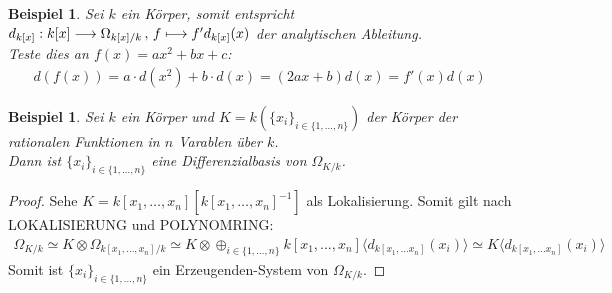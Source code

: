 \documentclass[10pt,a4paper]{report}
\newcounter{Aussage}[chapter]
\newtheorem{bsp}[Aussage]{Beispiel}
\newcommand{\function}[5]{\nolinebreak{#1:#2 \longrightarrow #3 \, , \, #4 \longmapsto #5}}
\newcommand{\divR}[2]{\Omega_{#1/#2}}
\newcommand{\divf}[1]{d_{#1}}
\newcommand{\tensor}[3]{#1 \otimes #3}
\newcommand{\lok}[2]{#1 [#2^{-1}]}
\begin{document}
\begin{bsp}\label{Ableitung ist Ableitung}
Sei $k$ ein Körper, somit entspricht $\function{\divf{k[x]}}{k[x]}{\divR{k[x]}{k}}{f}{f'\divf{k[x]}(x)}$ der analytischen Ableitung.\\
Teste dies an $f(x)=ax^2 + bx +c$:
\begin{gather*}
d(f(x)) = a \cdot d(x^2) + b \cdot d(x) = (2ax + b) d(x) = f'(x) d(x) 
\end{gather*}
\end{bsp}


\begin{bsp}
Sei $k$ ein Körper und $K = k(\lbrace x_i \rbrace_{i \in \lbrace 1,\dots,n \rbrace})$ der Körper der rationalen Funktionen in $n$ Varablen über $k$.\\
Dann ist $\lbrace x_i \rbrace_{i \in \lbrace 1,\dots,n \rbrace}$ eine Differenzialbasis von $\divR{K}{k}$.
\end{bsp}
\begin{proof}
Sehe $K = \lok{k[x_1,\dots,x_n]}{k[x_1,\dots,x_n]}$ als Lokalisierung. Somit gilt nach LOKALISIERUNG und POLYNOMRING:
\begin{gather*}
\divR{K}{k} \simeq \tensor{K}{k[x_1,\dots,x_n]}{\divR{k[x_1,\dots,x_n]}{k}} \simeq \tensor{K}{k[x_1,\dots,x_n]}{\oplus_{i \in \lbrace 1,\dots,n \rbrace} k[x_1,\dots,x_n]\langle \divf{k[x_1,\dots x_n]}(x_i) \rangle} \simeq K\langle \divf{k[x_1,\dots x_n]}(x_i) \rangle
\end{gather*}
Somit ist $\lbrace x_i \rbrace_{i \in \lbrace 1,\dots,n \rbrace}$ ein Erzeugenden-System von $\divR{K}{k}$.
\end{proof}
\end{document}
